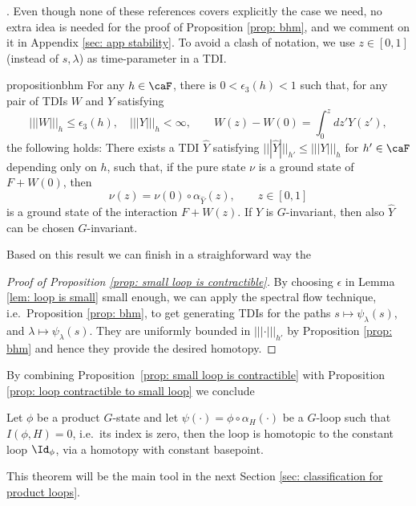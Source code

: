 \cite{bravyi2010topological,michalakis2013stability,nachtergaele2020quasi}. Even though none of these references covers explicitly the case we need, no extra idea is needed for the proof of Proposition \ref{prop: bhm}, and we comment on it in Appendix \ref{sec: app stability}. 
To avoid a clash of notation, we use $z \in[0,1]$ (instead of $s,\lambda$) as time-parameter in a TDI.
\begin{restatable}{proposition}{bhm}\label{prop: bhm}
	For any $h\in\caF$, there is $0<\epsilon_3(h)< 1$ such that, for any pair of TDIs $W$ and $Y$ satisfying
	\begin{equation}\label{eq: w and e}
		|||W|||_h\leq \epsilon_3(h), \quad   |||Y|||_h <\infty, \qquad   W(z)-W(0)=\int^{z}_{0} d z' Y(z'),
	\end{equation}
	the following holds: There exists a TDI $\hat{Y}$ satisfying $|||\hat Y|||_{h'} \leq ||| Y|||_{h} $ for  $h' \in \caF$ depending only on $h$, such that, if the pure state $\nu$ is a ground state of $F+W(0)$, then  
	\begin{equation}\label{eq: states determined}
		\nu(z)=\nu(0)\circ\alpha_{\hat Y}(z),\qquad z \in [0,1] 
	\end{equation}
	is a ground state of the interaction $F+W(z)$. If $Y$ is $G$-invariant, then also $\hat{Y}$ can be chosen $G$-invariant.
\end{restatable}
Based on this result we can finish in a straighforward way the
\begin{proof}[Proof of Proposition \ref{prop: small loop is contractible}]
	By choosing $\epsilon$ in Lemma \ref{lem: loop is small} small enough, we can apply the spectral flow technique, i.e.\ Proposition \ref{prop: bhm}, to get generating TDIs for the paths $s\mapsto \psi_\lambda(s)$, and  $\lambda
	\mapsto \psi_\lambda(s)$. They are uniformly bounded in $|||\cdot|||_{h'}$ by Proposition \ref{prop: bhm} and hence they provide the desired homotopy. 
\end{proof}

By combining Proposition~\ref{prop: small loop is contractible} with Proposition \ref{prop: loop contractible to small loop} we conclude 
\begin{theorem}\label{thm: contractibility products}
	Let $\phi$ be a product $G$-state and let $\psi(\cdot)=\phi\circ\alpha_{H}(\cdot)$ be a $G$-loop such that $I(\phi,H)=0$, i.e.\ its index is zero, then the loop is homotopic to the constant loop $\Id_\phi$, via a homotopy with constant basepoint. 
\end{theorem}
This theorem will be the main tool in the next Section \ref{sec: classification for product loops}. 


